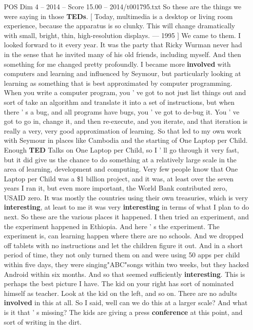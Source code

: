 \begin{textsample}{POS Dim 4 – 2014 – Score 15.00 – 2014/t001795.txt}
So these are the things we were saying in those \textbf{TEDs}. [ Today, multimedia is a desktop or living room experience, because the apparatus is so clunky.
This will change dramatically with small, bright, thin, high-resolution displays. — 1995 ] We came to them.
I looked forward to it every year.
It was the party that Ricky Wurman never had in the sense that he invited many of his old friends, including myself.
And then something for me changed pretty profoundly.
I became more \textbf{involved} with computers and learning and influenced by Seymour, but particularly looking at learning as something that is best approximated by computer programming.
When you write a computer program, you ' ve got to not just list things out and sort of take an algorithm and translate it into a set of instructions, but when there ' s a bug, and all programs have bugs, you ' ve got to de-bug it.
You ' ve got to go in, change it, and then re-execute, and you iterate, and that iteration is really a very, very good approximation of learning.
So that led to my own work with Seymour in places like Cambodia and the starting of One Laptop per Child.
Enough \textbf{TED} Talks on One Laptop per Child, so I ' ll go through it very fast, but it did give us the chance to do something at a relatively large scale in the area of learning, development and computing.
Very few people know that One Laptop per Child was a \$1 billion project, and it was, at least over the seven years I ran it, but even more important, the World Bank contributed zero, USAID zero.
It was mostly the countries using their own treasuries, which is very \textbf{interesting}, at least to me it was very \textbf{interesting} in terms of what I plan to do next.
So these are the various places it happened.
I then tried an experiment, and the experiment happened in Ethiopia.
And here ' s the experiment.
The experiment is, can learning happen where there are no schools.
And we dropped off tablets with no instructions and let the children figure it out.
And in a short period of time, they not only turned them on and were using 50 apps per child within five days, they were singing"ABC"songs within two weeks, but they hacked Android within six months.
And so that seemed sufficiently \textbf{interesting}.
This is perhaps the best picture I have.
The kid on your right has sort of nominated himself as teacher.
Look at the kid on the left, and so on.
There are no adults \textbf{involved} in this at all.
So I said, well can we do this at a larger scale?
And what is it that ' s missing?
The kids are giving a press \textbf{conference} at this point, and sort of writing in the dirt.

\end{textsample}

